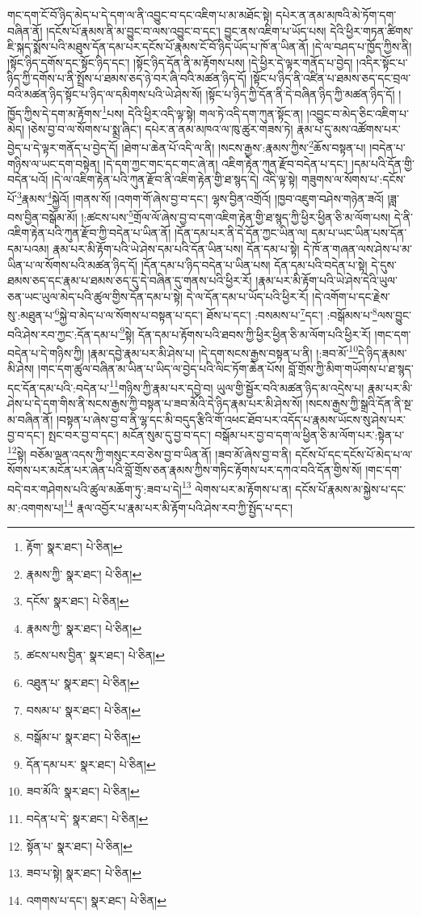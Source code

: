 གང་དག་ངོ་བོ་ཉིད་མེད་པ་དེ་དག་ལ་ནི་འབྱུང་བ་དང་འཇིག་པ་མ་མཐོང་སྟེ། དཔེར་ན་ནམ་མཁའི་མེ་ཏོག་དག་བཞིན་ནོ། །དངོས་པོ་རྣམས་ནི་མ་བྱུང་བ་ལས་འབྱུང་བ་དང་། བྱུང་ནས་འཇིག་པ་ཡོད་པས། དེའི་ཕྱིར་གཏན་ཚིགས་ཇི་སྐད་སྨོས་པའི་མཐུས་དོན་དམ་པར་དངོས་པོ་རྣམས་ངོ་བོ་ཉིད་ཡོད་པ་ཁོ་ན་ཡིན་ནོ། །དེ་ལ་བཤད་པ་ཁྱོད་ཀྱིས་ནི། །སྟོང་ཉིད་དགོས་དང་སྟོང་ཉིད་དང་། །སྟོང་ཉིད་དོན་ནི་མ་རྟོགས་པས། །དེ་ཕྱིར་དེ་ལྟར་གནོད་པ་བྱེད། །འདིར་སྟོང་པ་ཉིད་ཀྱི་དགོས་པ་ནི་སྤྲོས་པ་ཐམས་ཅད་ཉེ་བར་ཞི་བའི་མཚན་ཉིད་དོ། །སྟོང་པ་ཉིད་ནི་འཛིན་པ་ཐམས་ཅད་དང་བྲལ་བའི་མཚན་ཉིད་སྟོང་པ་ཉིད་ལ་དམིགས་པའི་ཡེ་ཤེས་སོ། །སྟོང་པ་ཉིད་ཀྱི་དོན་ནི་དེ་བཞིན་ཉིད་ཀྱི་མཚན་ཉིད་དོ། །ཁྱོད་ཀྱིས་དེ་དག་མ་རྟོགས་\footnote{རྟོག་  སྣར་ཐང་།  པེ་ཅིན། }པས། དེའི་ཕྱིར་འདི་ལྟ་སྟེ། གལ་ཏེ་འདི་དག་ཀུན་སྟོང་ན། །འབྱུང་བ་མེད་ཅིང་འཇིག་པ་མེད། །ཅེས་བྱ་བ་ལ་སོགས་པ་སྨྲ་ཞིང་། དཔེར་ན་ནམ་མཁའ་ལ་ཁུ་ཚུར་གཟས་ཏེ། རྣམ་པ་དུ་མས་འཚོགས་པར་བྱེད་པ་དེ་ལྟར་གནོད་པ་བྱེད་དོ། །ཐེག་པ་ཆེན་པོ་འདི་ལ་ནི། །སངས་རྒྱས་:རྣམས་ཀྱིས་\footnote{རྣམས་ཀྱི་  སྣར་ཐང་།  པེ་ཅིན། }ཆོས་བསྟན་པ། །བདེན་པ་གཉིས་ལ་ཡང་དག་བསྟེན། །དེ་དག་ཀྱང་གང་དང་གང་ཞེ་ན། འཇིག་རྟེན་ཀུན་རྫོབ་བདེན་པ་དང་། །དམ་པའི་དོན་གྱི་བདེན་པའོ། །དེ་ལ་འཇིག་རྟེན་པའི་ཀུན་རྫོབ་ནི་འཇིག་རྟེན་གྱི་ཐ་སྙད་དེ། འདི་ལྟ་སྟེ། གཟུགས་ལ་སོགས་པ་:དངོས་པོ་\footnote{དངོས་  སྣར་ཐང་།  པེ་ཅིན། }རྣམས་\footnote{རྣམས་ཀྱི་  སྣར་ཐང་།  པེ་ཅིན། }སྐྱེའོ། །གནས་སོ། །འགག་གོ་ཞེས་བྱ་བ་དང་། ལྷས་བྱིན་འགྲོའོ། །ཁྱབ་འཇུག་བཤེས་གཉེན་ཟའོ། །ཟླ་བས་བྱིན་བསྒོམ་མོ། །:ཚངས་པས་\footnote{ཚངས་པས་བྱིན་  སྣར་ཐང་།  པེ་ཅིན། }གྲོལ་ལོ་ཞེས་བྱ་བ་དག་འཇིག་རྟེན་གྱི་ཐ་སྙད་ཀྱི་ཕྱིར་ཕྱིན་ཅི་མ་ལོག་པས། དེ་ནི་འཇིག་རྟེན་པའི་ཀུན་རྫོབ་ཀྱི་བདེན་པ་ཡིན་ནོ། །དོན་དམ་པར་ནི་དེ་དོན་ཀྱང་ཡིན་ལ། དམ་པ་ཡང་ཡིན་པས་དོན་དམ་པའམ། རྣམ་པར་མི་རྟོག་པའི་ཡེ་ཤེས་དམ་པའི་དོན་ཡིན་པས། དོན་དམ་པ་སྟེ། དེ་ཁོ་ན་གཞན་ལས་ཤེས་པ་མ་ཡིན་པ་ལ་སོགས་པའི་མཚན་ཉིད་དོ། །དོན་དམ་པ་ཉིད་བདེན་པ་ཡིན་པས། དོན་དམ་པའི་བདེན་པ་སྟེ། དེ་དུས་ཐམས་ཅད་དང་རྣམ་པ་ཐམས་ཅད་དུ་དེ་བཞིན་དུ་གནས་པའི་ཕྱིར་རོ། །རྣམ་པར་མི་རྟོག་པའི་ཡེ་ཤེས་དེའི་ཡུལ་ཅན་ཡང་ཡུལ་མེད་པའི་ཚུལ་གྱིས་དོན་དམ་པ་སྟེ། དེ་ལ་དོན་དམ་པ་ཡོད་པའི་ཕྱིར་རོ། །དེ་འགོག་པ་དང་རྗེས་སུ་:མཐུན་པ་\footnote{འཐུན་པ་  སྣར་ཐང་།  པེ་ཅིན། }སྐྱེ་བ་མེད་པ་ལ་སོགས་པ་བསྟན་པ་དང་། ཐོས་པ་དང་། :བསམས་པ་\footnote{བསམ་པ་  སྣར་ཐང་།  པེ་ཅིན། }དང་། :བསྒོམས་པ་\footnote{བསྒོམ་པ་  སྣར་ཐང་།  པེ་ཅིན། }ལས་བྱུང་བའི་ཤེས་རབ་ཀྱང་:དོན་དམ་པ་\footnote{དོན་དམ་པར་  སྣར་ཐང་།  པེ་ཅིན། }སྟེ། དོན་དམ་པ་རྟོགས་པའི་ཐབས་ཀྱི་ཕྱིར་ཕྱིན་ཅི་མ་ལོག་པའི་ཕྱིར་རོ། །གང་དག་བདེན་པ་དེ་གཉིས་ཀྱི། །རྣམ་དབྱེ་རྣམ་པར་མི་ཤེས་པ། །དེ་དག་སངས་རྒྱས་བསྟན་པ་ནི། །:ཟབ་མོ་\footnote{ཟབ་མོའི་  སྣར་ཐང་།  པེ་ཅིན། }དེ་ཉིད་རྣམས་མི་ཤེས། །གང་དག་ཚུལ་བཞིན་མ་ཡིན་པ་ཡིད་ལ་བྱེད་པའི་ལིང་ཏོག་ཆེན་པོས། བློ་གྲོས་ཀྱི་མིག་གཡོགས་པ་ཐ་སྙད་དང་དོན་དམ་པའི་:བདེན་པ་\footnote{བདེན་པ་དེ་  སྣར་ཐང་།  པེ་ཅིན། }གཉིས་ཀྱི་རྣམ་པར་དབྱེ་བ། ཡུལ་གྱི་སྦྱོར་བའི་མཚན་ཉིད་མ་འདྲེས་པ། རྣམ་པར་མི་ཤེས་པ་དེ་དག་གིས་ནི་སངས་རྒྱས་ཀྱི་བསྟན་པ་ཟབ་མོའི་དེ་ཉིད་རྣམ་པར་མི་ཤེས་སོ། །སངས་རྒྱས་ཀྱི་སྒྲའི་དོན་ནི་སྔ་མ་བཞིན་ནོ། །བསྟན་པ་ཞེས་བྱ་བ་ནི་ལྷ་དང་མི་བདུད་རྩིའི་གོ་འཕང་ཐོབ་པར་འདོད་པ་རྣམས་ཡོངས་སུ་ཤེས་པར་བྱ་བ་དང་། སྤང་བར་བྱ་བ་དང་། མངོན་སུམ་དུ་བྱ་བ་དང་། བསྒོམ་པར་བྱ་བ་དག་ལ་ཕྱིན་ཅི་མ་ལོག་པར་:སྟེན་པ་\footnote{སྟོན་པ་  སྣར་ཐང་།  པེ་ཅིན། }སྟེ། བཅོམ་ལྡན་འདས་ཀྱི་གསུང་རབ་ཅེས་བྱ་བ་ཡིན་ནོ། །ཟབ་མོ་ཞེས་བྱ་བ་ནི། དངོས་པོ་དང་དངོས་པོ་མེད་པ་ལ་སོགས་པར་མངོན་པར་ཞེན་པའི་བློ་གྲོས་ཅན་རྣམས་ཀྱིས་གཏིང་རྟོགས་པར་དཀའ་བའི་དོན་གྱིས་སོ། །གང་དག་བདེ་བར་གཤེགས་པའི་ཚུལ་མཆོག་ཏུ་:ཟབ་པ་དེ།\footnote{ཟབ་པ་སྟེ།  སྣར་ཐང་།  པེ་ཅིན། } ལེགས་པར་མ་རྟོགས་པ་ན། དངོས་པོ་རྣམས་མ་སྐྱེས་པ་དང་མ་:འགགས་པ།\footnote{འགགས་པ་དང་།  སྣར་ཐང་།  པེ་ཅིན། } རྣལ་འབྱོར་པ་རྣམ་པར་མི་རྟོག་པའི་ཤེས་རབ་ཀྱི་སྤྱོད་པ་དང་། 